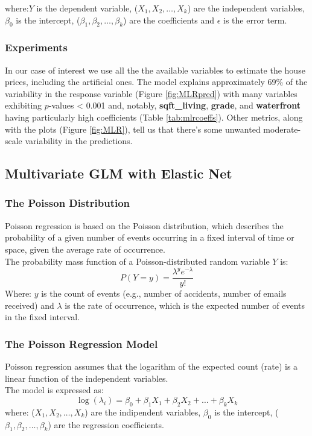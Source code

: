 \documentclass[a4paper, 11pt]{article}
\begin{document}
\begin{multicols}{2}
where:$Y$ is the dependent variable, ($X_1, X_2,\dots,X_k$) are the independent variables, $\beta_0$ is the intercept, ($\beta_1,\beta_2, \dots, \beta_k$) are the coefficients and $\epsilon$ is the error term.\\

\subsubsection*{Experiments}
In our case of interest we use all the the available variables to estimate the house prices, including the artificial ones. The model explains approximately 69\% of the variability in the response variable (Figure \ref{fig:MLRpred}) with many variables exhibiting \( p \)-values < 0.001 and, notably, \textbf{sqft\_living}, \textbf{grade}, and \textbf{waterfront} having particularly high coefficients (Table \ref{tab:mlrcoeffs}). Other metrics, along with the plots (Figure \ref{fig:MLR}), tell us that there's some unwanted moderate-scale variability in the predictions.


\subsection{Multivariate GLM with Elastic Net} \vspace{-3pt}
\subsubsection*{The Poisson Distribution}
Poisson regression is based on the Poisson distribution, which describes the probability of a given number of events occurring in a fixed interval of time or space, given the average rate of occurrence.\\
The probability mass function of a Poisson-distributed random variable $Y$ is:
\begin{equation}
P(Y=y)= \frac{\lambda^ye^{-\lambda}}{y!}
\end{equation}
Where: $y$ is the count of events (e.g., number of accidents, number of emails received) and $\lambda$ is the rate of occurrence, which is the expected number of events in the fixed interval.
\subsubsection*{The Poisson Regression Model}
Poisson regression assumes that the logarithm of the expected count (rate) is a linear function of the independent variables.\\
The model is expressed as:
\begin{equation}
\log(\lambda_i)=\beta_0+\beta_1X_1+\beta_2X_2+\dots+\beta_kX_k
\end{equation}
where: ($X_1, X_2,\dots,X_k$) are the indipendent variables, $\beta_0$ is the intercept, ($\beta_1,\beta_2, \dots, \beta_k$) are the regression coefficients.


\end{multicols}
\end{document}
